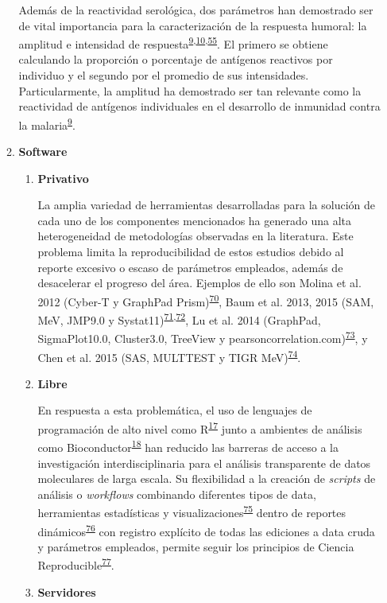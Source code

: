 \documentclass[]{article}
\begin{document}
\begin{enumerate}
\begin{enumerate}
    Además de la reactividad serológica, dos parámetros han demostrado
    ser de vital importancia para la caracterización de la respuesta
    humoral: la amplitud e intensidad de
    respuesta\textsuperscript{\protect\hyperlink{ref-crompton2010}{9},\protect\hyperlink{ref-Helb2015exposure}{10},\protect\hyperlink{ref-King2015FOC}{55}}.
    El primero se obtiene calculando la proporción o porcentaje de
    antígenos reactivos por individuo y el segundo por el promedio de
    sus intensidades. Particularmente, la amplitud ha demostrado ser tan
    relevante como la reactividad de antígenos individuales en el
    desarrollo de inmunidad contra la
    malaria\textsuperscript{\protect\hyperlink{ref-crompton2010}{9}}. 
  \item
    \textbf{Software}

    \begin{enumerate}
    \def\labelenumiii{\arabic{enumiii}.}
    \item
      \textbf{Privativo}

      La amplia variedad de herramientas desarrolladas para la solución
      de cada uno de los componentes mencionados ha generado una alta
      heterogeneidad de metodologías observadas en la literatura. Este
      problema limita la reproducibilidad de estos estudios debido al
      reporte excesivo o escaso de parámetros empleados, además de
      desacelerar el progreso del área. Ejemplos de ello son Molina et
      al. 2012 (Cyber-T y GraphPad
      Prism)\textsuperscript{\protect\hyperlink{ref-molina2012}{70}},
      Baum et al. 2013, 2015 (SAM, MeV, JMP9.0 y
      Systat11)\textsuperscript{\protect\hyperlink{ref-baum2013}{71},\protect\hyperlink{ref-baum2015}{72}},
      Lu et al. 2014 (GraphPad, SigmaPlot10.0, Cluster3.0, TreeView y
      pearsoncorrelation.com)\textsuperscript{\protect\hyperlink{ref-lu2014rama}{73}},
      y Chen et al. 2015 (SAS, MULTTEST y TIGR
      MeV)\textsuperscript{\protect\hyperlink{ref-chen2015immunomics}{74}}.
    \item
      \textbf{Libre}

      En respuesta a esta problemática, el uso de lenguajes de
      programación de alto nivel como
      R\textsuperscript{\protect\hyperlink{ref-R2016}{17}} junto a
      ambientes de análisis como
      Bioconductor\textsuperscript{\protect\hyperlink{ref-bioconductor2004}{18}}
      han reducido las barreras de acceso a la investigación
      interdisciplinaria para el análisis transparente de datos
      moleculares de larga escala. Su flexibilidad a la creación de
      \emph{scripts} de análisis o \emph{workflows} combinando
      diferentes tipos de data, herramientas estadísticas y
      visualizaciones\textsuperscript{\protect\hyperlink{ref-Biobase}{75}}
      dentro de reportes
      dinámicos\textsuperscript{\protect\hyperlink{ref-knitr}{76}} con
      registro explícito de todas las ediciones a data cruda y
      parámetros empleados, permite seguir los principios de Ciencia
      Reproducible\textsuperscript{\protect\hyperlink{ref-CienciaReproducible2016}{77}}.
      \newpage
    \item
      \textbf{Servidores}


\end{enumerate}
\end{enumerate}
\end{enumerate}
\end{document}
